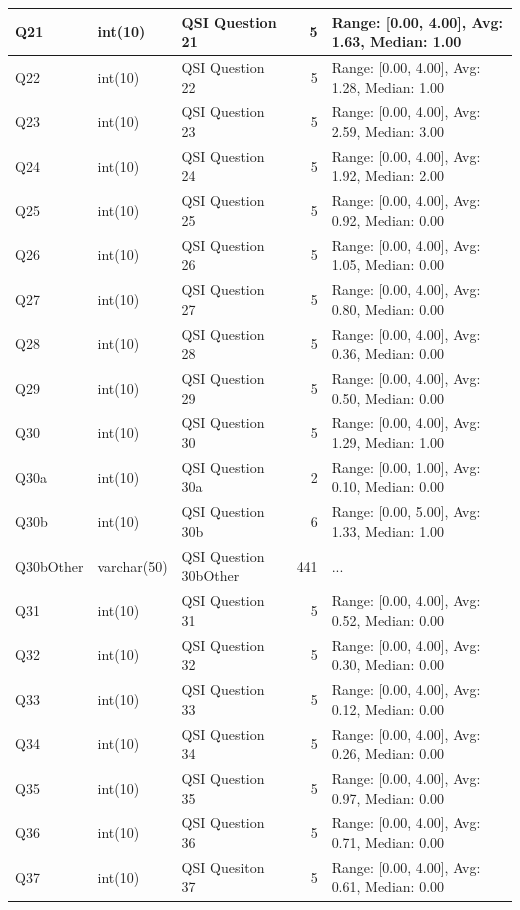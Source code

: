 \begin{landscape}
\begin{longtable}{|l|l|l|r|p{6cm}|}
\hline
Q21 & int(10) & QSI Question 21 & 5 & Range: [0.00, 4.00], Avg: 1.63, Median: 1.00 \\
\hline
Q22 & int(10) & QSI Question 22 & 5 & Range: [0.00, 4.00], Avg: 1.28, Median: 1.00 \\
\hline
Q23 & int(10) & QSI Question 23 & 5 & Range: [0.00, 4.00], Avg: 2.59, Median: 3.00 \\
\hline
Q24 & int(10) & QSI Question 24 & 5 & Range: [0.00, 4.00], Avg: 1.92, Median: 2.00 \\
\hline
Q25 & int(10) & QSI Question 25 & 5 & Range: [0.00, 4.00], Avg: 0.92, Median: 0.00 \\
\hline
Q26 & int(10) & QSI Question 26 & 5 & Range: [0.00, 4.00], Avg: 1.05, Median: 0.00 \\
\hline
Q27 & int(10) & QSI Question 27 & 5 & Range: [0.00, 4.00], Avg: 0.80, Median: 0.00 \\
\hline
Q28 & int(10) & QSI Question 28 & 5 & Range: [0.00, 4.00], Avg: 0.36, Median: 0.00 \\
\hline
Q29 & int(10) & QSI Question 29 & 5 & Range: [0.00, 4.00], Avg: 0.50, Median: 0.00 \\
\hline
Q30 & int(10) & QSI Question 30 & 5 & Range: [0.00, 4.00], Avg: 1.29, Median: 1.00 \\
\hline
Q30a & int(10) & QSI Question 30a & 2 & Range: [0.00, 1.00], Avg: 0.10, Median: 0.00 \\
\hline
Q30b & int(10) & QSI Question 30b & 6 & Range: [0.00, 5.00], Avg: 1.33, Median: 1.00 \\
\hline
Q30bOther & varchar(50) & QSI Question 30bOther & 441 & ... \\
\hline
Q31 & int(10) & QSI Question 31 & 5 & Range: [0.00, 4.00], Avg: 0.52, Median: 0.00 \\
\hline
Q32 & int(10) & QSI Question 32 & 5 & Range: [0.00, 4.00], Avg: 0.30, Median: 0.00 \\
\hline
Q33 & int(10) & QSI Question 33 & 5 & Range: [0.00, 4.00], Avg: 0.12, Median: 0.00 \\
\hline
Q34 & int(10) & QSI Question 34 & 5 & Range: [0.00, 4.00], Avg: 0.26, Median: 0.00 \\
\hline
Q35 & int(10) & QSI Question 35 & 5 & Range: [0.00, 4.00], Avg: 0.97, Median: 0.00 \\
\hline
Q36 & int(10) & QSI Question 36 & 5 & Range: [0.00, 4.00], Avg: 0.71, Median: 0.00 \\
\hline
Q37 & int(10) & QSI Quesiton 37 & 5 & Range: [0.00, 4.00], Avg: 0.61, Median: 0.00 \\

\end{longtable}
\end{landscape}
